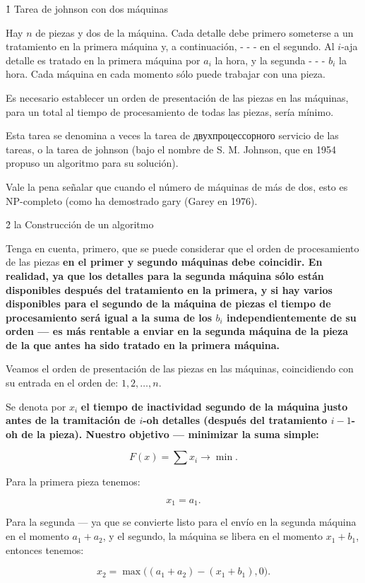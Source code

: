 \h1{ Tarea de johnson con dos máquinas }

Hay $n$ de piezas y dos de la máquina. Cada detalle debe primero someterse a un tratamiento en la primera máquina y, a continuación, - - - en el segundo. Al $i$-aja detalle es tratado en la primera máquina por $a_i$ la hora, y la segunda - - - $b_i$ la hora. Cada máquina en cada momento sólo puede trabajar con una pieza.

Es necesario establecer un orden de presentación de las piezas en las máquinas, para un total al tiempo de procesamiento de todas las piezas, sería mínimo.

Esta tarea se denomina a veces la tarea de двухпроцессорного servicio de las tareas, o la tarea de johnson (bajo el nombre de S. M. Johnson, que en 1954 propuso un algoritmo para su solución).

Vale la pena señalar que cuando el número de máquinas de más de dos, esto es NP-completo (como ha demostrado gary (Garey en 1976).


\h2{ la Construcción de un algoritmo }

Tenga en cuenta, primero, que se puede considerar que el orden de procesamiento de las piezas \bf{en el primer y segundo máquinas debe coincidir}. En realidad, ya que los detalles para la segunda máquina sólo están disponibles después del tratamiento en la primera, y si hay varios disponibles para el segundo de la máquina de piezas el tiempo de procesamiento será igual a la suma de los $b_i$ independientemente de su orden --- es más rentable a enviar en la segunda máquina de la pieza de la que antes ha sido tratado en la primera máquina.

Veamos el orden de presentación de las piezas en las máquinas, coincidiendo con su entrada en el orden de: $1, 2, \ldots, n$.

Se denota por $x_i$ \bf{el tiempo de inactividad} segundo de la máquina justo antes de la tramitación de $i$-oh detalles (después del tratamiento $i-1$-oh de la pieza). Nuestro objetivo --- \bf{minimizar la suma simple}:

$$ F(x) = \sum x_i \longrightarrow \min. $$

Para la primera pieza tenemos:

$$ x_1 = a_1. $$

Para la segunda --- ya que se convierte listo para el envío en la segunda máquina en el momento $a_1+a_2$, y el segundo, la máquina se libera en el momento $x_1 + b_1$, entonces tenemos:

$$ x_2 = \max \Big( (a_1+a_2) - (x_1+b_1), 0 \Big). $$

